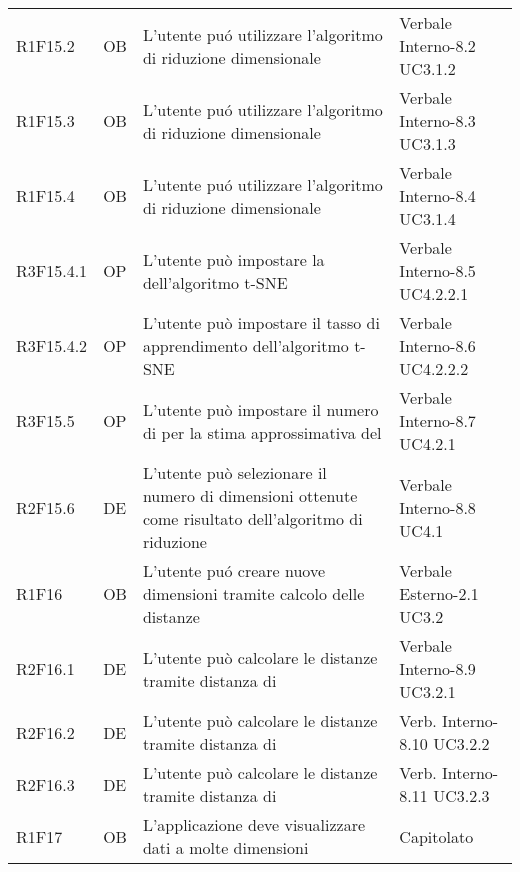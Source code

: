 {\begin{longtable}{C{2cm} | C{1.5cm} | C{9cm} | C{3.3cm}}
R1F15.2 & OB & L'utente puó utilizzare l'algoritmo di riduzione dimensionale  & Verbale Interno-8.2 \newline UC3.1.2\\
R1F15.3 & OB & L'utente puó utilizzare l'algoritmo di riduzione dimensionale  & Verbale Interno-8.3 \newline UC3.1.3\\
R1F15.4 & OB & L'utente puó utilizzare l'algoritmo di riduzione dimensionale  & Verbale Interno-8.4 \newline UC3.1.4\\
R3F15.4.1 & OP & L'utente può impostare la  dell'algoritmo t-SNE & Verbale Interno-8.5 \newline UC4.2.2.1\\
R3F15.4.2 & OP & L'utente può impostare il tasso di apprendimento dell'algoritmo t-SNE & Verbale Interno-8.6 \newline UC4.2.2.2\\
R3F15.5 & OP & L'utente può impostare il numero di  per la stima approssimativa del  & Verbale Interno-8.7 \newline UC4.2.1\\
R2F15.6 & DE & L'utente può selezionare il numero di dimensioni ottenute come risultato dell'algoritmo di riduzione & Verbale Interno-8.8 \newline UC4.1\\
R1F16 & OB & L'utente puó creare nuove dimensioni tramite calcolo delle distanze & Verbale Esterno-2.1 \newline UC3.2\\ 
R2F16.1 & DE & L'utente può calcolare le distanze tramite distanza di  &  Verbale Interno-8.9 \newline UC3.2.1\\
R2F16.2 & DE & L'utente può calcolare le distanze tramite distanza di  & Verb. Interno-8.10 \newline UC3.2.2 \\
R2F16.3 & DE & L'utente può calcolare le distanze tramite distanza di  &  Verb. Interno-8.11 \newline UC3.2.3\\
R1F17 & OB & L'applicazione deve visualizzare dati a molte dimensioni & Capitolato\\


\end{longtable}
}







